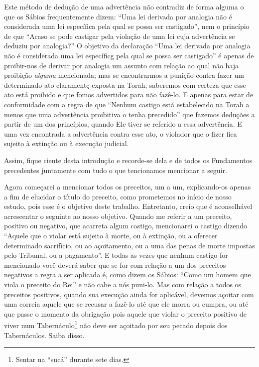 Este método de dedução de uma advertência não contradiz de forma alguma
o que os Sábios frequentemente dizem: ``Uma lei derivada por analogia
não é considerada uma lei específica pela qual se possa ser castigado'',
nem o princípio de que ``Acaso se pode castigar pela violação de uma lei
cuja advertência se deduziu por analogia?'' O objetivo da declaração
``Uma lei derivada por analogia não é considerada uma lei específicg
pela qual se possa ser castigado'' é apenas de proibir-nos de derivar
por analogia um assunto com relação ao qual não haja proibição
\emph{alguma} mencionada; mas se encontrarmos a punição contra fazer um
determinado ato claramentç exposta na Torah, saberemos com certeza que
esse ato está proibido e que fomos advertidos para não fazê-lo. E apenas
para estar de conformidade com a regra de que ``Nenhum castigo está
estabelecido na Torah a menos que uma advertência proibitiva o tenha
precedido'' que fazemos deduções a partir de um dos princípios, quando
Ele tiver se referido a essa advertência. E uma vez encontrada a
advertência contra esse ato, o violador que o fizer fica sujeito à
extinção ou à execução judicial.

Assim, fique ciente desta introdução e recorde-se dela e de todos os
Fundamentos precedentes juntamente com tudo o que tencionamos mencionar
a seguir.

Agora começarei a mencionar todos os preceitos, um a um, explicando-os
apenas a fim de elucidar o título do preceito, como prometemos no início
de nosso estudo, pois esse é o objetivo deste trabalho. Entretanto,
creio que é aconselhável acrescentar o seguinte ao nosso objetivo.
Quando me referir a um preceito, positivo ou negativo, que acarreta
algum castigo, mencionarei o castigo dizendo ``Aquele que o violar está
sujeito à morte, ou à extinção, ou a oferecer determinado sacrifício, ou
ao açoitamento, ou a uma das penas de morte impostas pelo Tribunal, ou a
pagamento''. E todas as vezes que nenhum castigo for mencionado você
deverá saber que se for com relação a um dos preceitos negativos a regra
a ser aplicada é, como dizem os Sábios: ``Como um homem que viola o
preceito do Rei'' e não cabe a nós puni-lo. Mas com relação a todos os
preceitos positivos, quando sua execução ainda for aplicável, devemos
açoitar com uma correia aquele que se recusar a fazê-lo até que
ele morra ou cumpra, ou até que passe o momento da obrigação pois aquele
que violar o preceito positivo de viver num
Tabernáculo\footnote{Sentar na ``sucá'' durante sete dias.} não deve ser açoitado por seu pecado depois dos Tabernáculos. Saiba disso.

